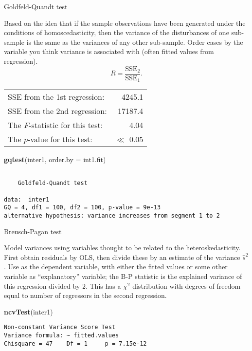 \documentclass[10pt,ignorenonframetext,]{beamer}
\newenvironment{Shaded}{\begin{snugshade}}{\end{snugshade}}
\newcommand{\KeywordTok}[1]{\textcolor[rgb]{0.13,0.29,0.53}{\textbf{#1}}}
\newcommand{\DataTypeTok}[1]{\textcolor[rgb]{0.13,0.29,0.53}{#1}}
\newcommand{\NormalTok}[1]{#1}
\begin{document}
\begin{frame}[fragile]{Goldfeld-Quandt test}

\footnotesize
Based on the idea that if the sample observations have been generated
under the conditions of homoscedasticity, then the variance of the
disturbances of one sub-sample is the same as the variances of any other
sub-sample. Order cases by the variable you think variance is associated
with (often fitted values from regression). \[
R = \frac{\text{SSE}_2}{\text{SSE}_1}.
\]

\begin{center}
\begin{tabular}{lr}
  SSE from the 1st regression:&    4245.1\\
  SSE from the 2nd regression: &  17187.4\\
  The $F$-statistic for this test:&    4.04\\
  The $p$-value for this test:     &    $\ll$ 0.05   \\
\end{tabular}
\end{center}

\begin{Shaded}
\begin{Highlighting}[]
\KeywordTok{gqtest}\NormalTok{(inter1, }\DataTypeTok{order.by =}\NormalTok{ int1.fit)}
\end{Highlighting}
\end{Shaded}

\begin{verbatim}

    Goldfeld-Quandt test

data:  inter1
GQ = 4, df1 = 100, df2 = 100, p-value = 9e-13
alternative hypothesis: variance increases from segment 1 to 2
\end{verbatim}

\end{frame}

\begin{frame}[fragile]{Breusch-Pagan test}

Model variances using variables thought to be related to the
heteroskedasticity. First obtain residuals by OLS, then divide these by
an estimate of the variance \(\hat{s}^2\). Use as the dependent
variable, with either the fitted values or some other variable as
``explanatory'' variable; the B-P statistic is the explained variance of
this regression divided by 2. This has a \(\chi^2\) distribution with
degrees of freedom equal to number of regressors in the second
regression.

\begin{Shaded}
\begin{Highlighting}[]
\KeywordTok{ncvTest}\NormalTok{(inter1)}
\end{Highlighting}
\end{Shaded}

\begin{verbatim}
Non-constant Variance Score Test 
Variance formula: ~ fitted.values 
Chisquare = 47    Df = 1     p = 7.15e-12 
\end{verbatim}

\end{frame}
\end{document}
